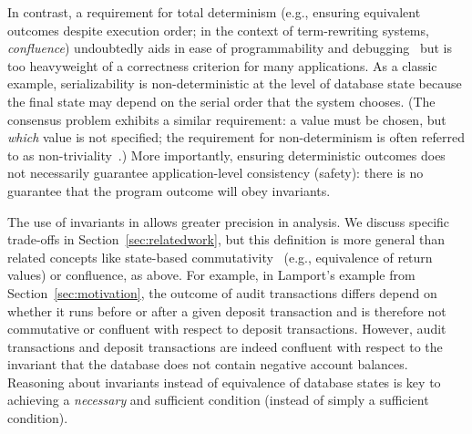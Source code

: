In contrast, a requirement for total determinism (e.g., ensuring
equivalent outcomes despite execution order; in the context of
term-rewriting systems, \textit{confluence}) undoubtedly aids in ease
of programmability and debugging~\cite{blooml,calm,termrewriting} but
is too heavyweight of a correctness criterion for many
applications. As a classic example, serializability is
non-deterministic at the level of database state because the final
state may depend on the serial order that the system chooses. (The
consensus problem exhibits a similar requirement: a value must be
chosen, but \textit{which} value is not specified; the requirement for
non-determinism is often referred to as
non-triviality~\cite{paxos-commit}.) More importantly, ensuring
deterministic outcomes does not necessarily guarantee
application-level consistency (safety): there is no guarantee that the
program outcome will obey invariants.

The use of invariants in \iconfluence allows greater precision in
analysis. We discuss specific trade-offs in
Section~\ref{sec:relatedwork}, but this definition is more general
than related concepts like state-based
commutativity~\cite{weihl-thesis} (e.g., equivalence of return values)
or confluence, as above. For example, in Lamport's example from
Section~\ref{sec:motivation}, the outcome of audit transactions
differs depend on whether it runs before or after a given deposit
transaction and is therefore not commutative or confluent with respect
to deposit transactions. However, audit transactions and deposit
transactions are indeed confluent with respect to the invariant that
the database does not contain negative account balances. Reasoning
about invariants instead of equivalence of database states is key to
achieving a \textit{necessary} and sufficient condition (instead of
simply a sufficient condition).

